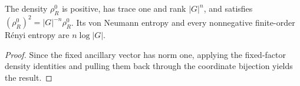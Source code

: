 \begin{lemma}%
    \label{thm:peps_regular_reference_boundary_density}
    \leanok
    The density $\rho_R^0$ is positive, has trace one and rank $|G|^n$, and
    satisfies $(\rho_R^0)^2=|G|^{-n}\rho_R^0$. Its von Neumann entropy and
    every nonnegative finite-order R\'enyi entropy are $n\log|G|$.
\end{lemma}
\begin{proof}\leanok
    Since the fixed ancillary vector has norm one, applying the fixed-factor density
    identities and pulling them back through the coordinate bijection yields the result.
\end{proof}

